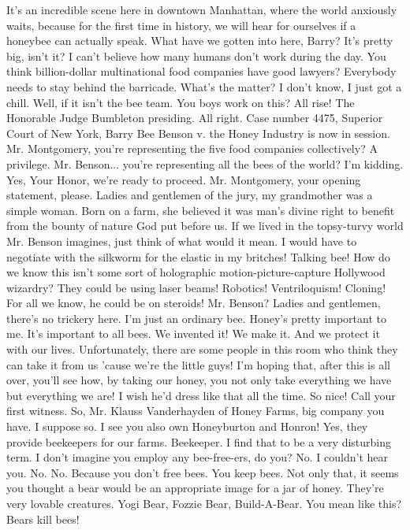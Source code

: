 \documentclass[a4paper,12pt]{article}
\begin{document}
It's an incredible scene here in downtown Manhattan, where the world anxiously waits, because for the first time in history, we will hear for ourselves if a honeybee can actually speak.
What have we gotten into here, Barry?
It's pretty big, isn't it?
I can't believe how many humans don't work during the day.
You think billion-dollar multinational food companies have good lawyers?
Everybody needs to stay behind the barricade.
What's the matter?
I don't know, I just got a chill.
Well, if it isn't the bee team.
You boys work on this?
All rise! The Honorable Judge Bumbleton presiding.
All right. Case number 4475,
Superior Court of New York,
Barry Bee Benson v. the Honey Industry is now in session.
Mr. Montgomery, you're representing the five food companies collectively?
A privilege.
Mr. Benson... you're representing all the bees of the world?
I'm kidding. Yes, Your Honor, we're ready to proceed.
Mr. Montgomery, your opening statement, please.
Ladies and gentlemen of the jury, my grandmother was a simple woman. Born on a farm, she believed it was man's divine right to benefit from the bounty of nature God put before us.
If we lived in the topsy-turvy world Mr. Benson imagines, just think of what would it mean.
I would have to negotiate with the silkworm for the elastic in my britches!
Talking bee!
How do we know this isn't some sort of holographic motion-picture-capture Hollywood wizardry?
They could be using laser beams! Robotics! Ventriloquism! Cloning! For all we know, he could be on steroids!
Mr. Benson?
Ladies and gentlemen, there's no trickery here. I'm just an ordinary bee. Honey's pretty important to me. It's important to all bees. We invented it! We make it. And we protect it with our lives.
Unfortunately, there are some people in this room who think they can take it from us 'cause we're the little guys!
I'm hoping that, after this is all over, you'll see how, by taking our honey, you not only take everything we have but everything we are!
I wish he'd dress like that all the time. So nice!
Call your first witness.
So, Mr. Klauss Vanderhayden of Honey Farms, big company you have.
I suppose so.
I see you also own Honeyburton and Honron!
Yes, they provide beekeepers for our farms.
Beekeeper. I find that to be a very disturbing term.
I don't imagine you employ any bee-free-ers, do you?
No.
I couldn't hear you.
No.
No. Because you don't free bees. You keep bees. Not only that, it seems you thought a bear would be an appropriate image for a jar of honey.
They're very lovable creatures. Yogi Bear, Fozzie Bear, Build-A-Bear.
You mean like this?
Bears kill bees!
\end{document}
